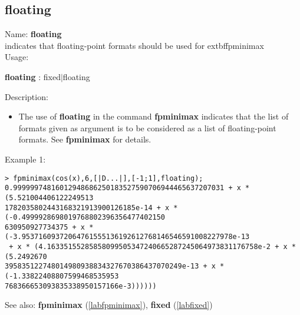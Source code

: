 \subsection{floating}
\label{labfloating}
\noindent Name: \textbf{floating}\\
indicates that floating-point formats should be used for 	extbf{fpminimax}\\
\noindent Usage: 
\begin{center}
\textbf{floating} : \textsf{fixed$|$floating}
\end{center}
\noindent Description: \begin{itemize}

\item The use of \textbf{floating} in the command \textbf{fpminimax} indicates that the list of
   formats given as argument is to be considered as a list of floating-point
   formats.
   See \textbf{fpminimax} for details.
\end{itemize}
\noindent Example 1: 
\begin{center}\begin{minipage}{15cm}\begin{Verbatim}[frame=single]
> fpminimax(cos(x),6,[|D...|],[-1;1],floating);
0.99999974816012948686250183527590706944465637207031 + x * (5.521004406122249513
1782035802443168321913900126185e-14 + x * (-0.4999928698019768802396356477402150
630950927734375 + x * (-3.95371609372064761555136192612768146546591008227978e-13
 + x * (4.16335155285858099505347240665287245064973831176758e-2 + x * (5.2492670
395835122748014980938834327670386437070249e-13 + x * (-1.33822408807599468535953
768366653093835338950157166e-3))))))
\end{Verbatim}
\end{minipage}\end{center}
See also: \textbf{fpminimax} (\ref{labfpminimax}), \textbf{fixed} (\ref{labfixed})
